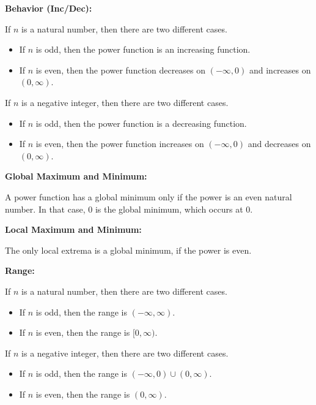 \documentclass{ximera}
\begin{document}
\begin{explanation}
\textbf{Behavior (Inc/Dec):} 

If $n$ is a natural number, then there are two different cases.

\begin{itemize}
\item If $n$ is odd, then the power function is an increasing function.
\item If $n$ is even, then the power function decreases on $(-\infty, 0)$ and increases on $(0, \infty)$.
\end{itemize}

If $n$ is a negative integer, then there are two different cases.

\begin{itemize}
\item If $n$ is odd, then the power function is a decreasing function.
\item If $n$ is even, then the power function increases on $(-\infty, 0)$ and decreases on $(0, \infty)$.
\end{itemize}



\textbf{Global Maximum and Minimum:} 

A power function has a global minimum only if the power is an even natural number. In that case, $0$ is the global minimum, which occurs at $0$.

\textbf{Local Maximum and Minimum:} 

The only local extrema is a global minimum, if the power is even.

\textbf{Range:} 

If $n$ is a natural number, then there are two different cases.

\begin{itemize}
\item If $n$ is odd, then the range is $(-\infty, \infty)$.
\item If $n$ is even, then the range is $[0, \infty)$.
\end{itemize}

If $n$ is a negative integer, then there are two different cases.

\begin{itemize}
\item If $n$ is odd, then the range is $(-\infty, 0) \cup (0, \infty)$.
\item If $n$ is even, then the range is $(0, \infty)$.
\end{itemize}


\end{explanation}
\end{document}
